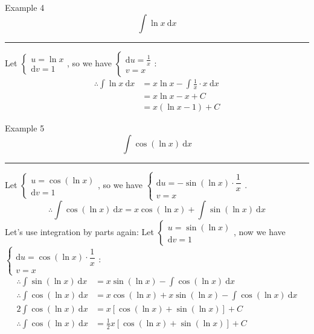 \documentclass[12pt,a4paper]{article}
\def\d{{\mathrm{d}}}
\begin{document}
\begin{eg}{Example 4}
	$$\int\ln x\ \d x$$
	\noindent\rule[0.25\baselineskip]{\textwidth}{1pt}
	Let $\begin{cases}u=\ln x\\\d v=1\end{cases}$, so we have $\begin{cases}\d u=\frac{1}{x}\\v=x\end{cases}$: 
	$$\begin{aligned}
		\therefore\int\ln x\ \d x&=x\ln x-\int\frac{1}{x}\cdot x\ \d x\\
		&=x\ln x-x+C\\
		&=x(\ln x-1)+C
	\end{aligned}$$
\end{eg}
\begin{eg}{Example 5}
	$$\int\cos(\ln x)\ \d x$$
	\noindent\rule[0.25\baselineskip]{\textwidth}{1pt}
	Let $\begin{cases}u=\cos(\ln x)\\\d v=1\end{cases}$, so we have $\begin{cases}\d u=-\sin(\ln x)\cdot\dfrac{1}{x}\\v=x\end{cases}$.
	$$\therefore\int\cos(\ln x)\ \d x=x\cos(\ln x)+\int\sin(\ln x)\ \d x$$
	Let's use integration by parts again: Let $\begin{cases}u=\sin(\ln x)\\\d v=1\end{cases}$, now we have $\begin{cases}\d u=\cos(\ln x)\cdot\dfrac{1}{x}\\v=x\end{cases}$:
	$$\begin{aligned}
		\therefore\int\sin(\ln x)\ \d x&=x\sin(\ln x)-\int\cos(\ln x)\ \d x\\
		\therefore\int\cos(\ln x)\ \d x&=x\cos(\ln x)+x\sin(\ln x)-\int\cos(\ln x)\ \d x\\
		2\int\cos(\ln x)\ \d x&=x\left[\cos(\ln x)+\sin(\ln x)\right]+C\\
		\therefore\int\cos(\ln x)\ \d x&=\frac{1}{2}x\left[\cos(\ln x)+\sin(\ln x)\right]+C
	\end{aligned}$$
\end{eg}
\end{document}
